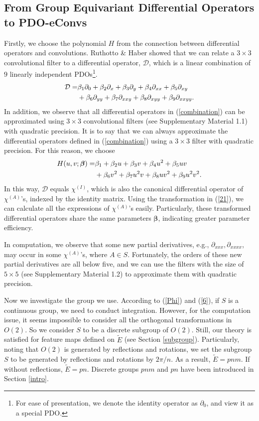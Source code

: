 \documentclass{article}
\begin{document}
\subsection{From Group Equivariant Differential Operators to PDO-eConvs}
Firstly, we choose the polynomial $H$ from the connection between differential operators and convolutions. Ruthotto \& Haber  showed that we can relate a $3\times3$ convolutional filter to a differential operator, $\mathcal{D}$, which is a linear combination of $9$ linearly independent PDOs\footnote{For ease of presentation, we denote the identity operator as $\partial_0$, and view it as a  special PDO.}.
\begin{align}
\mathcal{D}=&\beta_1\partial_0+\beta_2 \partial_{x}+\beta_3 \partial_{y}+\beta_4 \partial_{xx}+\beta_5\partial_{xy}\\
&+\beta_6\partial_{yy}+\beta_7\partial_{xxy}+\beta_8\partial_{xyy}+\beta_9\partial_{xxyy}.\notag
\label{combination}
\end{align}
In addition, we observe that all differential operators in (\ref{combination}) can be approximated using $3\times3$ convolutional filters (see Supplementary Material 1.1) with quadratic precision. It is to say that we can always approximate the differential operators defined in (\ref{combination}) using a $3\times 3$ filter with quadratic precision. For this reason, we choose 
\begin{align}
H(u,v;\bm{\beta})=&\beta_1+\beta_2u+\beta_3v+\beta_4u^2+\beta_5uv\\
&+\beta_6v^2+\beta_7u^2v+\beta_8uv^2+\beta_9u^2v^2.\notag
\end{align}
In this way, $\mathcal{D}$ equals $\chi^{(I)}$, which is also the canonical differential operator of $\chi^{(A)}$'s, indexed by the identity matrix. Using the transformation in (\ref{21}), we can calculate all the expressions of $\chi^{(A)}$'s easily. Particularly, these transformed differential operators share the same parameters $\bm{\beta}$, indicating greater parameter efficiency.

In computation, we observe that some new partial derivatives, e.g., $\partial_{xxx},\partial_{xxxx}$, may occur in some $\chi^{(A)}$'s, where $A\in S$. Fortunately, the orders of these new partial derivatives are all below five, and we can use the filters with the size of $5\times 5$ (see Supplementary Material 1.2) to approximate them with quadratic precision. 

Now we investigate the group we use. According to (\ref{Phi}) and (\ref{6}), if $S$ is a continuous group, we need to conduct integration. However, for the computation issue, it seems impossible to consider all the orthogonal transformations in $O(2)$.
So we consider $S$ to be a discrete subgroup of $O(2)$. Still, our theory is satisfied for feature maps defined on $\tilde{E}$ (see Section \ref{subgroup}). 
Particularly, noting that $O(2)$ is generated by reflections and rotations, we set the subgroup $S$ to be generated by reflections and rotations by $2\pi/n$. 
As a result, $\tilde{E}=pnm$. If without reflections, $\tilde{E}=pn$. Discrete groups $pnm$ and $pn$ have been introduced in Section \ref{intro}.
\end{document}
